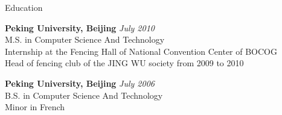\documentclass{resume} %
\begin{document}
\begin{rSection}{Education}

{\bf Peking University, Beijing} \hfill {\em July 2010} \\ 
M.S. in Computer Science And Technology \\
Internship at the Fencing Hall of National Convention Center of BOCOG \\
Head of fencing club of the JING WU society from 2009 to 2010 

{\bf Peking University, Beijing} \hfill {\em July 2006} \\ 
B.S. in Computer Science And Technology \\
Minor in French

\end{rSection}






\end{document}
